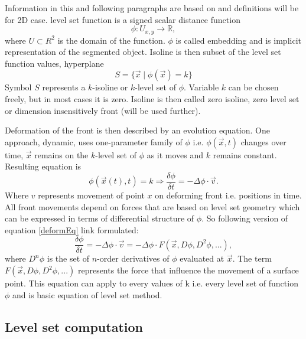 Information in this and following paragraphs are based on \cite{insightIntoImages} and definitions will be for 2D case.
level set function is a signed scalar distance function
\begin{equation}
\phi : U_{x,y} \rightarrow \mathbb R,
\end{equation}
where $U \subset R^2$ is the domain of the function.
$\phi$ is called embedding and is implicit representation of the segmented object.
Isoline is then subset of the level set function values, hyperplane
\begin{equation}
S = \{\vec{x}\mid \phi(\vec{x}) = k\}
\end{equation}
Symbol $S$ represents a $k$-isoline or $k$-level set of $\phi$.
Variable $k$ can be chosen freely, but in most cases it is zero.
Isoline is then called zero isoline, zero level set or dimension insensitively front (will be used further).

\par
Deformation of the front is then described by an evolution equation.
One approach, dynamic, uses one-parameter family of $\phi$ i.e. $\phi(\vec{x},t)$ changes over time, $\vec{x}$ remains on the $k$-level set of $\phi$ as it moves and $k$ remains constant.
Resulting equation is
\begin{equation}
\label{deformEq}
\phi(\vec{x}(t),t) = k \Rightarrow \frac{\delta \phi}{\delta t} = - \Delta \phi
\cdot \vec{v}.
\end{equation}
Where $v$ represents movement of point $x$ on deforming front i.e. positions in time.
All front movements depend on forces that are based on level set geometry which can be expressed in terms of differential structure of $\phi$.
So following version of equation \ref{deformEq} link formulated:
\begin{equation}
\frac{\delta\phi}{\delta t} = - \Delta \phi \cdot \vec{v} = - \Delta \phi
\cdot F(\vec{x}, D\phi, D^2\phi, ...),
\end{equation}
where $D^n\phi$ is the set of $n$-order derivatives of $\phi$ evaluated at $\vec{x}$.
The term $F(\vec{x}, D\phi, D^2\phi, ...)$ represents the force that influence the movement of a surface point.
This equation can apply to every values of k i.e. every level set of function $\phi$ and is basic equation of level set method.

\subsection{Level set computation}

